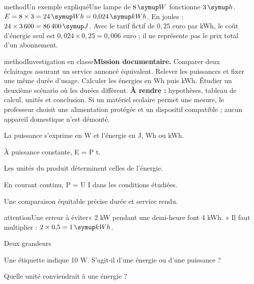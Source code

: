 \begin{pcEncadre}{method}{Un exemple expliqué}Une lampe de $8\unite W$ fonctionne $3\unite h$. $E=8\times3=24\unite{Wh}=0{,}024\unite{kWh}$. En joules : $24\times3\,600=86\,400\unite J$. Avec le tarif fictif de $0{,}25$ euro par kWh, le coût d’énergie seul est $0{,}024\times0{,}25=0{,}006$ euro ; il ne représente pas le prix total d’un abonnement.\end{pcEncadre}
\label{activite-15}
\begin{pcEncadre}{method}{Investigation en classe}\textbf{Mission documentaire.} Comparer deux éclairages assurant un service annoncé équivalent. Relever les puissances et fixer une même durée d’usage. Calculer les énergies en Wh puis kWh. Étudier un deuxième scénario où les durées diffèrent. \textbf{À rendre :} hypothèses, tableau de calcul, unités et conclusion. Si un matériel scolaire permet une mesure, le professeur choisit une alimentation protégée et un dispositif compatible ; aucun appareil domestique n’est démonté.\end{pcEncadre}
\begin{questions}
\item La puissance s’exprime en W et l’énergie en J, Wh ou kWh.
\item À puissance constante, E = P t.
\item Les unités du produit déterminent celles de l’énergie.
\item En courant continu, P = U I dans les conditions étudiées.
\item Une comparaison équitable précise durée et service rendu.
\end{questions}
\begin{pcEncadre}{attention}{Une erreur à éviter}« 2 kW pendant une demi-heure font 4 kWh. » Il faut multiplier : $2\times0{,}5=1\unite{kWh}$.\end{pcEncadre}
\pcGrille
\clearpage{}
\par\noindent\begin{minipage}{\linewidth}
\begin{exercice}[1]{Deux grandeurs}
\begin{questions}
\item Une étiquette indique 10 W. S’agit-il d’une énergie ou d’une puissance ?
\item Quelle unité conviendrait à une énergie ?
\end{questions}
\end{exercice}
\end{minipage}
